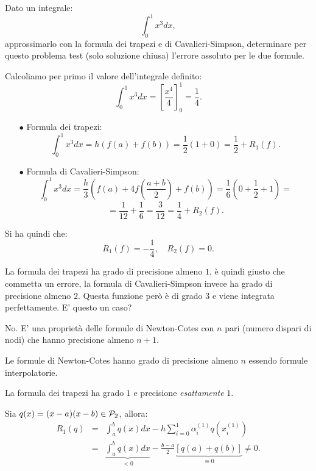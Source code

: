 \begin{ese}
Dato un integrale:
\[\int_0^1x^3dx,\]
approssimarlo con la formula dei trapezi e di Cavalieri-Simpson, determinare
per questo problema test (solo soluzione chiusa) l'errore assoluto per le due
formule.

\begin{svol}
Calcoliamo per primo il valore dell'integrale definito:
\[\int_0^1x^3dx = \left[\frac{x^4}{4}\right]_0^1 = \frac{1}{4}.\]
\begin{itemize}
\item[$\bullet$]Formula dei trapezi:
\[\int_0^1x^3dx = h(f(a)+f(b)) = \frac{1}{2}(1+0) = \frac{1}{2} + R_1(f).\]
\item[$\bullet$]Formula di Cavalieri-Simpson:
\[\int_0^1x^3dx = \frac{h}{3}\left(f(a)+4f\left(\frac{a+b}{2}\right) +f(b)
\right) = \frac{1}{6}\left(0 + \frac{1}{2} + 1\right) =\]
\[= \frac{1}{12} + 
\frac{1}{6} = \frac{3}{12} = \frac{1}{4} + R_2(f).\]
\end{itemize}
Si ha quindi che:
\[R_1(f) = - \frac{1}{4}, \quad R_2(f) = 0.\]

La formula dei trapezi ha grado di precisione almeno $1$, è quindi giusto che
commetta un errore, la formula di Cavalieri-Simpson invece ha grado di
precisione almeno $2$. Questa funzione però è di grado $3$ e viene integrata
perfettamente. E' questo un caso?
\end{svol}

No. E' una proprietà delle formule di Newton-Cotes con $n$ pari (numero
dispari di nodi) che hanno precisione almeno $n+1$.
\end{ese}

\begin{osse}
Le formule di Newton-Cotes hanno grado di precisione almeno $n$ essendo
formule interpolatorie.
\end{osse}

\begin{prop}
La  formula dei trapezi ha grado $1$ e precisione \emph{esattamente} $1$.
\end{prop}
\begin{dimo}
Sia $q(x) = (x-a)(x-b) \in \mathcal{P}_2$, allora:
\[\begin{array}{lcl}
R_1(q) & = & \displaystyle
             \int_a^bq(x)dx - h\sum_{i=0}^1\alpha_i^{(1)}q(x_i^{(1)}) \\
      & = & \underbrace{\int_a^bq(x)dx}_{< 0} -\frac{b-a}{2}
\underbrace{[q(a)+q(b)]}_{\equiv 0} \neq 0.
\end{array}\]
\end{dimo}

